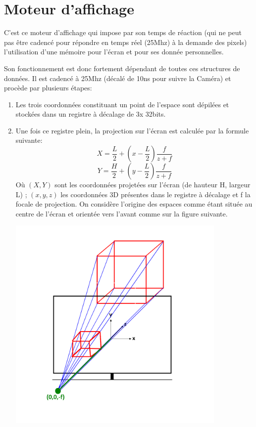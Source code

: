 \documentclass[10pt,a4paper]{report}
\begin{document}
\section{Moteur d'affichage}

C'est ce moteur d'affichage qui impose par son temps de réaction (qui ne peut pas être cadencé pour répondre en temps réel (25Mhz) à la demande des pixels) l'utilisation d'une mémoire pour l'écran et pour ses donnée personnelles.

Son fonctionnement est donc fortement dépendant de toutes ces structures de données. Il est cadencé à 25Mhz (décalé de 10ns pour suivre la Caméra) et procède par plusieurs étapes:
\begin{enumerate}
\item Les trois coordonnées constituant un point de l'espace sont dépilées et stockées dans un registre à décalage de 3x 32bits.
\item Une fois ce registre plein, la projection sur l'écran est calculée par la formule suivante:
\[ X = \frac{L}{2} + \left(x-\frac{L}{2}\right)\frac{f}{z+f} \]
\[ Y = \frac{H}{2} + \left(y-\frac{L}{2}\right)\frac{f}{z+f} \]
Où $\left(X,Y\right)$ sont les coordonnées projetées sur l'écran (de hauteur H, largeur L) ; $\left(x,y,z\right)$ les coordonnées 3D présentes dans le registre à décalage et f la focale de projection. On considère l'origine des espaces comme étant située au centre de l'écran et orientée vers l'avant comme sur la figure suivante.

\begin{center}
\includegraphics[width=300pt]{gfx/proj.png}
\end{center}


\end{enumerate}
\end{document}
